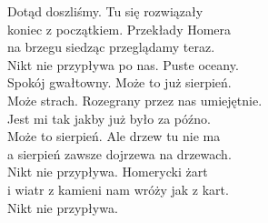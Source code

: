 \begin{text}
    Dotąd doszliśmy. Tu się rozwiązały\\
    koniec z początkiem. Przekłady Homera\\
    na brzegu siedząc przeglądamy teraz.\\
    Nikt nie przypływa po nas. Puste oceany.\\
    Spokój gwałtowny. Może to już sierpień.\\
    Może strach. Rozegrany przez nas umiejętnie.\\
    Jest mi tak jakby już było za późno.\\
    Może to sierpień. Ale drzew tu nie ma\\
    a sierpień zawsze dojrzewa na drzewach.\\
    Nikt nie przypływa. Homerycki żart\\
    i wiatr z kamieni nam wróży jak z kart.\\
    Nikt nie przypływa.
\end{text}
\begin{chord}

\end{chord}